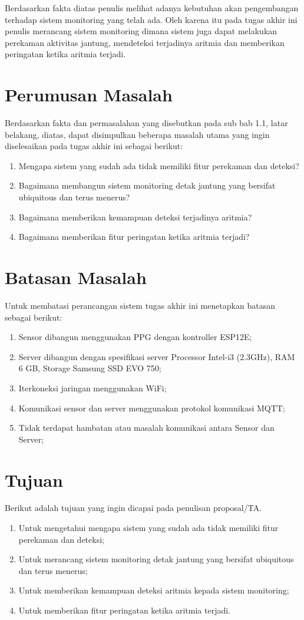 Berdasarkan fakta diatas penulis melihat adanya kebutuhan akan pengembangan terhadap sistem monitoring yang telah ada. Oleh karena itu pada tugas akhir ini penulis merancang sistem monitoring dimana sistem juga dapat melakukan perekaman aktivitas jantung, mendeteksi terjadinya aritmia dan memberikan peringatan ketika aritmia terjadi.

\section{Perumusan Masalah}
Berdasarkan fakta dan permasalahan yang disebutkan pada sub bab 1.1, latar belakang, diatas, dapat disimpulkan beberapa masalah utama yang ingin diselesaikan pada tugas akhir ini sebagai berikut:
\begin{enumerate}
	\item Mengapa sistem yang sudah ada tidak memiliki fitur perekaman dan deteksi?
	\item Bagaimana membangun sistem monitoring detak jantung yang bersifat ubiquitous dan terus menerus?
	\item Bagaimana memberikan kemampuan deteksi terjadinya aritmia?
	\item Bagaimana memberikan fitur peringatan ketika aritmia terjadi?
\end{enumerate}
\section{Batasan Masalah}
Untuk membatasi perancangan sistem tugas akhir ini menetapkan batasan sebagai berikut:
\begin{enumerate}
	\item Sensor dibangun menggunakan PPG dengan kontroller ESP12E;
    \item Server dibangun dengan spesifikasi server Processor Intel-i3 (2.3GHz), RAM 6 GB, Storage Samsung SSD EVO 750;
    \item Iterkoneksi jaringan menggunakan WiFi;
    \item Komunikasi sensor dan server menggunakan protokol
     komunikasi MQTT;
    \item Tidak terdapat hambatan atau masalah komunikasi antara Sensor dan Server;
\end{enumerate}
\section{Tujuan}
Berikut adalah tujuan yang ingin dicapai pada penulisan proposal/TA.
\begin{enumerate}
    \item Untuk mengetahui mengapa sistem yang sudah ada tidak memiliki fitur perekaman dan deteksi;
    \item Untuk merancang sistem monitoring detak jantung yang bersifat ubiquitous dan terus menerus;
    \item Untuk memberikan kemampuan deteksi aritmia kepada sistem monitoring;
    \item Untuk memberikan fitur peringatan ketika aritmia terjadi.
\end{enumerate}
